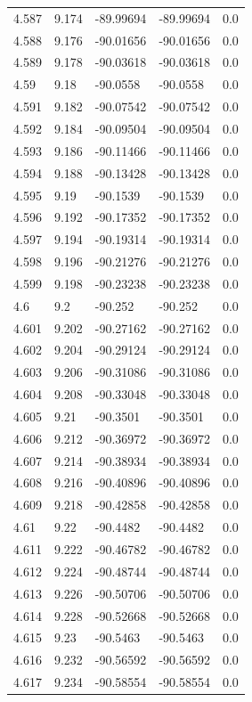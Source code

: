 \begin{tabular}{lllll}
4.587 & 9.174 & -89.99694 & -89.99694 & 0.0 \\
4.588 & 9.176 & -90.01656 & -90.01656 & 0.0 \\
4.589 & 9.178 & -90.03618 & -90.03618 & 0.0 \\
4.59 & 9.18 & -90.0558 & -90.0558 & 0.0 \\
4.591 & 9.182 & -90.07542 & -90.07542 & 0.0 \\
4.592 & 9.184 & -90.09504 & -90.09504 & 0.0 \\
4.593 & 9.186 & -90.11466 & -90.11466 & 0.0 \\
4.594 & 9.188 & -90.13428 & -90.13428 & 0.0 \\
4.595 & 9.19 & -90.1539 & -90.1539 & 0.0 \\
4.596 & 9.192 & -90.17352 & -90.17352 & 0.0 \\
4.597 & 9.194 & -90.19314 & -90.19314 & 0.0 \\
4.598 & 9.196 & -90.21276 & -90.21276 & 0.0 \\
4.599 & 9.198 & -90.23238 & -90.23238 & 0.0 \\
4.6 & 9.2 & -90.252 & -90.252 & 0.0 \\
4.601 & 9.202 & -90.27162 & -90.27162 & 0.0 \\
4.602 & 9.204 & -90.29124 & -90.29124 & 0.0 \\
4.603 & 9.206 & -90.31086 & -90.31086 & 0.0 \\
4.604 & 9.208 & -90.33048 & -90.33048 & 0.0 \\
4.605 & 9.21 & -90.3501 & -90.3501 & 0.0 \\
4.606 & 9.212 & -90.36972 & -90.36972 & 0.0 \\
4.607 & 9.214 & -90.38934 & -90.38934 & 0.0 \\
4.608 & 9.216 & -90.40896 & -90.40896 & 0.0 \\
4.609 & 9.218 & -90.42858 & -90.42858 & 0.0 \\
4.61 & 9.22 & -90.4482 & -90.4482 & 0.0 \\
4.611 & 9.222 & -90.46782 & -90.46782 & 0.0 \\
4.612 & 9.224 & -90.48744 & -90.48744 & 0.0 \\
4.613 & 9.226 & -90.50706 & -90.50706 & 0.0 \\
4.614 & 9.228 & -90.52668 & -90.52668 & 0.0 \\
4.615 & 9.23 & -90.5463 & -90.5463 & 0.0 \\
4.616 & 9.232 & -90.56592 & -90.56592 & 0.0 \\
4.617 & 9.234 & -90.58554 & -90.58554 & 0.0 \\

\end{tabular}
